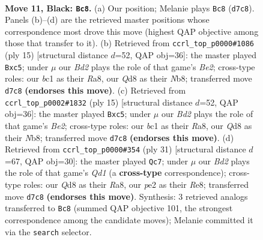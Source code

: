 \documentclass[11pt]{article}
\begin{document}
\clearpage

\begin{figure}[p]\centering
\begin{subfigure}{0.46\textwidth}\centering
\resizebox{\linewidth}{!}{%
\newchessgame
\chessboard[
  setfen={rn1q1rk1/1p1bbppp/4pn2/p7/P1PN3P/6P1/4PPB1/RNBQ1RK1 b - - 0 11},
  showmover=false,
  pgfstyle=straightmove, color=movearrow, markmove={d7-c8}
]}
\caption{}
\end{subfigure}\hfill
\begin{subfigure}{0.46\textwidth}\centering
\resizebox{\linewidth}{!}{%
\newchessgame
\chessboard[
  setfen={rnbq1rk1/pp2bppp/5n2/2Pp4/8/3B1N1P/PPP2PP1/RNBQ1RK1 b - - 0 8},
  showmover=false,
  pgfstyle=straightmove, color=movearrow, markmove={e7-c5}
]}
\caption{}
\end{subfigure}
\\[4pt]
\begin{subfigure}{0.46\textwidth}\centering
\resizebox{\linewidth}{!}{%
\newchessgame
\chessboard[
  setfen={rnbq1rk1/pp2bppp/5n2/2Pp4/8/3B1N1P/PPP2PP1/RNBQ1RK1 b - - 0 8},
  showmover=false,
  pgfstyle=straightmove, color=movearrow, markmove={e7-c5}
]}
\caption{}
\end{subfigure}\hfill
\begin{subfigure}{0.46\textwidth}\centering
\resizebox{\linewidth}{!}{%
\newchessgame
\chessboard[
  setfen={r2qrbk1/p4ppp/5n2/Npn1pN1b/4P3/6PP/1PP2PB1/R1B1QRK1 b - - 1 16},
  showmover=false,
  pgfstyle=straightmove, color=movearrow, markmove={d8-c7}
]}
\caption{}
\end{subfigure}
\caption{\textbf{Move 11, Black: \texttt{Bc8}.} (a) Our position; Melanie plays \texttt{Bc8} (\texttt{d7c8}). Panels (b)--(d) are the retrieved master positions whose correspondence most drove this move (highest QAP objective among those that transfer to it). (b) Retrieved from \texttt{ccrl\_top\_p0000\#1086} (ply 15) [structural distance $d$=52, QAP obj=36]: the master played \texttt{Bxc5}; under $\mu$ our \emph{Bd2} plays the role of that game's \emph{Be2}; cross-type roles: our \emph{b}c1 as their \emph{R}a8, our \emph{Q}d8 as their \emph{N}b8; transferred move \texttt{d7c8} \textbf{(endorses this move)}. (c) Retrieved from \texttt{ccrl\_top\_p0002\#1832} (ply 15) [structural distance $d$=52, QAP obj=36]: the master played \texttt{Bxc5}; under $\mu$ our \emph{Bd2} plays the role of that game's \emph{Be2}; cross-type roles: our \emph{b}c1 as their \emph{R}a8, our \emph{Q}d8 as their \emph{N}b8; transferred move \texttt{d7c8} \textbf{(endorses this move)}. (d) Retrieved from \texttt{ccrl\_top\_p0000\#354} (ply 31) [structural distance $d$=67, QAP obj=30]: the master played \texttt{Qc7}; under $\mu$ our \emph{Bd2} plays the role of that game's \emph{Qd1} (a \textbf{cross-type} correspondence); cross-type roles: our \emph{Q}d8 as their \emph{R}a8, our \emph{p}e2 as their \emph{R}e8; transferred move \texttt{d7c8} \textbf{(endorses this move)}. Synthesis: 3 retrieved analogs transferred to \texttt{Bc8} (summed QAP objective 101, the strongest correspondence among the candidate moves); Melanie committed it via the \texttt{search} selector.}
\label{fig:thought-m21}
\end{figure}
\end{document}
